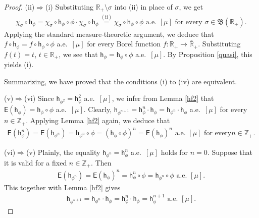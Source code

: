 \documentclass[draft,reqno]{amsproc}
\numberwithin{equation}{section}
\theoremstyle{remark}
\theoremstyle{definition}
\begin{document}
\begin{proof}
(ii)$\Rightarrow$(i) Substituting ${\mathbb R}_+\setminus
\sigma$ into (ii) in place of $\sigma$, we get
   \begin{align*}
\chi_{\sigma} \circ {\mathsf h}_{\phi} = \chi_{\sigma} \circ
{\mathsf h}_{\phi} \circ \phi \cdot \chi_{\sigma} \circ
{\mathsf h}_{\phi} \overset{\mathrm{(ii)}} = \chi_{\sigma}
\circ {\mathsf h}_{\phi} \circ \phi \text{ a.e.\ $[\mu]$ for
every $\sigma \in {{\mathfrak B}({{\mathbb R}_+})}$.}
   \end{align*}
Applying the standard measure-theoretic argument, we
deduce that $f \circ {\mathsf h}_{\phi} = f \circ {\mathsf h}_{\phi}
\circ \phi$ a.e.\ $[\mu]$ for every Borel function $f
\colon {\mathbb R}_+ \to {{\overline{\mathbb R}_+}}$. Substituting $f(t)=t$, $t
\in {\mathbb R}_+$, we see that ${\mathsf h}_{\phi} =
{\mathsf h}_{\phi}\circ \phi$ a.e.\ $[\mu]$. By Proposition
\ref{quasi}, this yields (i).

Summarizing, we have proved that the conditions (i) to
(iv) are equivalent.

(v)$\Rightarrow$(vi) Since ${\mathsf h}_{\phi^2} =
{\mathsf h}_{\phi}^2$ a.e.\ $[\mu]$, we infer from Lemma
\ref{hf2} that ${\mathsf{E}}({\mathsf h}_{\phi}) = {\mathsf h}_{\phi} \circ
\phi$ a.e.\ $[\mu]$. Clearly, ${\mathsf h}_{\phi^{n+1}} =
{\mathsf h}_{\phi}^n \cdot {\mathsf h}_{\phi} = {\mathsf h}_{\phi^n} \cdot
{\mathsf h}_{\phi}$ a.e.\ $[\mu]$ for every $n\in {\mathbb Z}_+$.
Applying Lemma \ref{hf2} again, we deduce that
   \begin{align*}
{\mathsf{E}}({\mathsf h}_{\phi}^n) = {\mathsf{E}}({\mathsf h}_{\phi^n}) =
{\mathsf h}_{\phi^n} \circ \phi = ({\mathsf h}_{\phi} \circ \phi)^n
= {\mathsf{E}}({\mathsf h}_{\phi})^n \text{ a.e.\ $[\mu]$ for every
$n \in {\mathbb Z}_+$.}
   \end{align*}

(vi)$\Rightarrow$(v) Plainly, the equality
${\mathsf h}_{\phi^n} = {\mathsf h}_{\phi}^n$ a.e.\ $[\mu]$ holds
for $n=0$. Suppose that it is valid for a fixed $n\in
{\mathbb Z}_+$. Then
   \begin{align*}
{\mathsf{E}}({\mathsf h}_{\phi^n}) = {\mathsf{E}}({\mathsf h}_{\phi})^n =
{\mathsf h}_{\phi}^n \circ \phi = {\mathsf h}_{\phi^n} \circ \phi
\text{ a.e.\ $[\mu]$.}
   \end{align*}
This together with Lemma \ref{hf2} gives
   \begin{align*}
{\mathsf h}_{\phi^{n+1}} = {\mathsf h}_{\phi^n} \cdot {\mathsf h}_{\phi} =
{\mathsf h}_{\phi}^n \cdot {\mathsf h}_{\phi} = {\mathsf h}_{\phi}^{n+1}
\text{ a.e.\ $[\mu]$.}
   \end{align*}


\end{proof}
\end{document}
